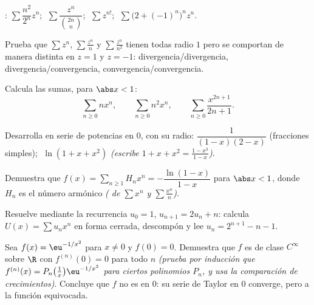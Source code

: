 \begin{exercise}[$\star$]\label{exo:b2:powerseries:1}
: $\sum \dfrac{n^2}{2^n}z^n$; $\;\sum
\dfrac{z^n}{\binom{2n}{n}}$; $\;\sum z^{n!}$; $\;\sum \bigl(2 +
(-1)^n\bigr)^n z^n$.
\end{exercise}

\begin{exercise}[$\star$]\label{exo:b2:powerseries:2}
Prueba que $\sum z^n$, $\sum \frac{z^n}{n}$ y $\sum
\frac{z^n}{n^2}$ tienen todas radio $1$ pero se comportan de manera
distinta en $z = 1$ y $z = -1$: divergencia/divergencia,
divergencia/convergencia, convergencia/convergencia.
\end{exercise}

\begin{exercise}[$\star$]\label{exo:b2:powerseries:3}
Calcula las sumas, para $\abs x < 1$:
\[
\sum_{n\geq0} n x^n,
\qquad
\sum_{n\geq0} n^2 x^n,
\qquad
\sum_{n\geq0} \frac{x^{2n+1}}{2n+1} .
\]
\end{exercise}

\begin{exercise}[$\star\star$]\label{exo:b2:powerseries:4}
Desarrolla en serie de potencias en $0$, con su radio:
$\dfrac{1}{(1-x)(2-x)}$ (fracciones simples); $\;\ln(1 + x + x^2)$
\emph{(escribe $1 + x + x^2 = \frac{1 - x^3}{1 - x}$)}.
\end{exercise}

\begin{exercise}[$\star\star$]\label{exo:b2:powerseries:5}
Demuestra que $f(x) = \sum_{n\geq1} H_n x^n = -\dfrac{\ln(1 - x)}{1
- x}$ para $\abs x < 1$, donde $H_n$ es el número armónico
\emph{( de $\sum x^n$ y $\sum \frac{x^n}{n}$)}.
\end{exercise}

\begin{exercise}[$\star\star$]\label{exo:b2:powerseries:6}
Resuelve mediante  la recurrencia $u_0 = 1$,
$u_{n+1} = 2u_n + n$: calcula $U(x) = \sum u_nx^n$ en forma cerrada,
descompón y lee $u_n = 2^{n+1} - n - 1$.
\end{exercise}

\begin{exercise}[$\star\star$]\label{exo:b2:powerseries:7}
Sea $f(x) = \eu^{-1/x^2}$ para $x \neq 0$ y $f(0) = 0$. Demuestra
que $f$ es de clase $C^\infty$ sobre $\R$ con $f^{(n)}(0) = 0$ para
todo $n$ \emph{(prueba por inducción que $f^{(n)}(x) =
P_n\bigl(\frac1x\bigr) \eu^{-1/x^2}$ para ciertos polinomios $P_n$,
y usa la comparación de crecimientos)}. Concluye que $f$ no es
 en $0$: su serie de Taylor en $0$ converge, pero a la
función equivocada.
\end{exercise}

